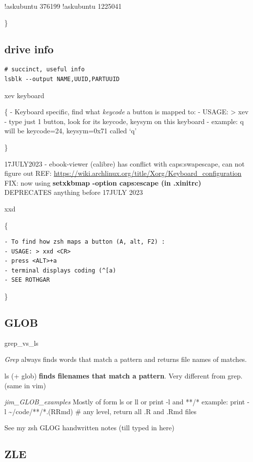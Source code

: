 \documentclass[
]{report}
\begin{document}
!askubuntu 376199 !askubuntu 1225041

\}

\subsection{drive info}\label{drive-info}

\begin{verbatim}
# succinct, useful info
lsblk --output NAME,UUID,PARTUUID
\end{verbatim}

xev keyboard

\{ - Keyboard specific, find what \emph{keycode} a button is mapped to:
- USAGE: \textgreater{} xev - type just 1 button, look for its keycode,
keysym on this keyboard - example: q will be keycode=24, keysym=0x71
called `q'

\}

17JULY2023 - ebook-viewer (calibre) has conflict with caps:swapescape,
can not figure out REF:
\url{https://wiki.archlinux.org/title/Xorg/Keyboard_configuration} FIX:
now using \textbf{setxkbmap -option caps:escape (in .xinitrc) }
DEPRECATES anything before 17JULY 2023

xxd

\{

\begin{verbatim}
- To find how zsh maps a button (A, alt, F2) :  
- USAGE: > xxd <CR>
- press <ALT>+a
- terminal displays coding (^[a)
- SEE ROTHGAR
\end{verbatim}

\}

\subsection{GLOB}\label{glob}

grep\_vs\_ls

\emph{Grep} always finds words that match a pattern and returns file
names of matches.

ls (+ glob) \textbf{finds filenames that match a pattern}. Very
different from grep. (same in vim)

\emph{jim\_GLOB\_examples} Mostly of form ls or ll or print -l and **/*
example: print -l \textasciitilde/code/**/*.(R\textbar Rmd) \# any
level, return all .R and .Rmd files

See my zsh GLOG handwritten notes (till typed in here)

\subsection{ZLE}\label{zle}
\end{document}
